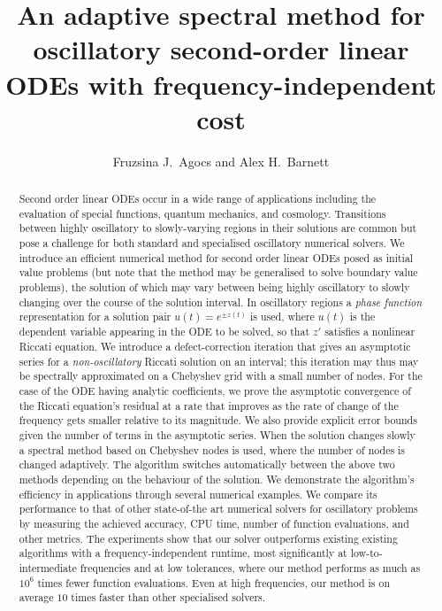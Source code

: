 \documentclass[10pt]{article}
\begin{document}
\title{An adaptive spectral method for oscillatory second-order linear ODEs with frequency-independent cost }

\author{Fruzsina J.\ Agocs and Alex H.\ Barnett}
\maketitle

\begin{abstract}
Second order linear ODEs occur in a wide range of applications including the
evaluation of special functions, quantum mechanics, and cosmology.
Transitions between highly oscillatory to slowly-varying regions in their
solutions are common but pose a challenge for both standard and specialised
oscillatory numerical solvers.
We introduce an efficient numerical method for second order linear ODEs posed
as initial value problems (but note that the method may be generalised to
solve boundary value problems), the solution of which may vary between
being highly oscillatory to slowly changing over the course of the solution interval.
In oscillatory regions
a \emph{phase function} representation for a solution pair $u(t) = e^{\pm
z(t)}$ is used, where $u(t)$ is the dependent variable appearing in the ODE
to be solved, so that $z'$ satisfies a nonlinear Riccati equation.  We
introduce a defect-correction iteration that gives an asymptotic series for
a \emph{non-oscillatory} Riccati solution on an interval; this iteration may
thus may be spectrally approximated on a Chebyshev grid with a small number
of nodes. For the case of the ODE having analytic coefficients, we prove
the asymptotic convergence of the Riccati equation's residual at a rate that improves as the rate of change of the frequency gets smaller relative to its magnitude. 
We also provide explicit error bounds given the number of terms in the asymptotic series.
When the solution changes slowly a spectral method based on Chebyshev
nodes is used, where the number of nodes is changed adaptively. The algorithm switches automatically between the above two methods depending on the behaviour of the solution.
We demonstrate the algorithm's efficiency in applications through several numerical examples.
We compare its performance to that of other state-of-the art numerical solvers for oscillatory problems by measuring the achieved accuracy, CPU time, number of function evaluations, and other metrics. 
The experiments show that our solver outperforms existing existing algorithms with a frequency-independent runtime, most significantly at low-to-intermediate frequencies and at low tolerances, where our method
performs as much as $10^6$ times fewer function evaluations. Even at high frequencies, our method is on average $10$ times faster than other specialised solvers.
\end{abstract}
\end{document}
